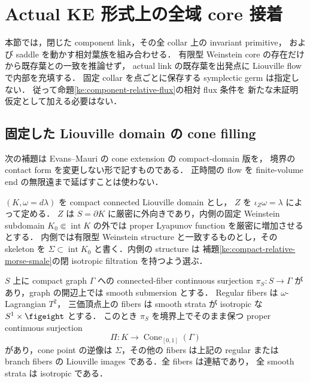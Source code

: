 \section{Actual KE 形式上の全域 core 接着}
\label{ke:actual-core-gluing-section}

本節では，閉じた component link，その全 collar 上の invariant primitive，
および saddle を動かす相対葉族を組み合わせる．
有限型 Weinstein core の存在だけから既存葉との一致を推論せず，
actual link の既存葉を出発点に Liouville flow で内部を充填する．
固定 collar を点ごとに保存する symplectic germ は指定しない．
従って命題\ref{ke:component-relative-flux}の相対 flux 条件を
新たな未証明仮定として加える必要はない．

\subsection{固定した Liouville domain の cone filling}

次の補題は Evans--Mauri の cone extension
\cite[Lemma~2.16 and Remark~2.18]{EM}の compact-domain 版を，
境界の contact form を変更しない形で記すものである．
正時間の flow を finite-volume end の無限遠まで延ばすことは使わない．

\begin{lemma}
\label{ke:actual-link-cone-filling}
$(K,\omega=d\lambda)$ を compact connected Liouville domain とし，
$Z$ を $\iota_Z\omega=\lambda$ によって定める．
$Z$ は $S=\partial K$ に厳密に外向きであり，内側の固定 Weinstein subdomain
$K_0\Subset\operatorname{int}K$ の外では proper Lyapunov function を厳密に増加させるとする．
内側では有限型 Weinstein structure と一致するものとし，その skeleton を
$\Sigma\subset\operatorname{int}K_0$ と書く．内側の structure は
補題\ref{ke:compact-relative-morse-smale}の閉 isotropic filtration を持つよう選ぶ．

$S$ 上に compact graph $\Gamma$ への connected-fiber continuous surjection
$\pi_S:S\to\Gamma$ があり，graph の開辺上では smooth submersion とする．
Regular fibers は $\omega$-Lagrangian $T^2$，
三価頂点上の fibers は smooth strata が isotropic な $S^1\times\figeight$ とする．
このとき $\pi_S$ を境界上でそのまま保つ proper continuous surjection
\[
 \Pi:K\longrightarrow\operatorname{Cone}_{[0,1]}(\Gamma)
\]
があり，cone point の逆像は $\Sigma$，その他の fibers は上記の regular または
branch fibers の Liouville images である．全 fibers は連結であり，
全 smooth strata は isotropic である．
\end{lemma}

